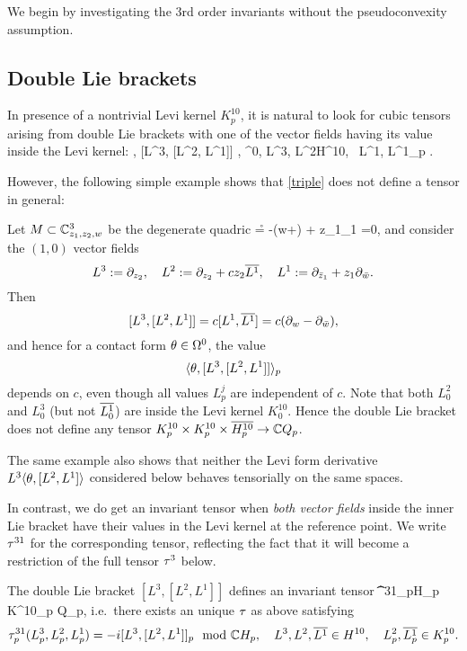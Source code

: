\documentclass[12pt]{amsart}
\begin{document}
We begin by investigating the $3$rd order invariants
without the pseudoconvexity assumption.

\subsection{Double Lie brackets}
In presence of a nontrivial Levi kernel $K^{10}_p$,
it is natural to look for cubic tensors
arising from double Lie brackets
with one of the vector fields 
having its value inside the Levi kernel: 
\beq{}
	\la \th, [L^3, [L^2, L^1]] \ra, 
	\quad
	\th \in \Om^0,
	\quad L^3, L^2\in H^{10}, 
	\, L^1\in {}, 
	\quad
	L^1_p \in {}.	
\eeq

However, the following simple example shows that 
\eqref{triple} does not define a tensor in general:

\be{}
Let $M\subset {\mathbb{C}}^3_{z_1, z_2, w}$ be
the degenerate quadric
\beq{}
	\r = -(w+\w) + z_1\z_1 =0,
\eeq
and consider the $(1,0)$ vector fields
$$
	L^3:= \partial_{z_2},
	\quad
	L^2:= \partial_{z_2} + cz_2 \overline{L^1},
	\quad
	L^1:= \partial_{{\bar z}_1} + z_1\partial_{{\bar w}}.
$$
Then 
$$
	[L^3, [L^2, L^1]] = c [L^1, \overline{L^1}] = c (\partial_{w} - \partial_{{\bar w}}),
$$
and hence for a contact form $\theta\in \Omega^0$,
the value $$\langle \theta, [L^3, [L^2, L^1]] \rangle_p$$
depends on $c$,
even though all values $L^j_p$ are independent of $c$.
Note that both $L^2_0$ and $L^3_0$ (but not $\overline{L^1_0}$)
are inside the Levi kernel $K^{10}_0$.
Hence the double Lie bracket does not define any tensor
$K^{10}_p\times K^{10}_p \times \overline{H^{10}_p}\to {\mathbb{C}} Q_p$.

The same example also shows that neither
the Levi form derivative $L^3 \langle \theta, [L^2, L^1]\rangle$
considered below
behaves tensorially on the same spaces.
\ee


In contrast, we do get an invariant tensor when {\em both vector fields}
inside the inner Lie bracket have their values in the Levi kernel
at the reference point.
We write $\tau^{31}$ for the corresponding tensor, 
reflecting the fact that it will become a restriction 
of the full tensor $\tau^3$ below.


\bl{}
	The double Lie bracket $[L^3, [L^2, L^1]]$ defines
	an invariant tensor
	\beq
		\t^{31}_p\colon \C H_p \times K^{10}_p \times {} \to \C Q_p,
	\eeq
	i.e.\ there exists an unique $\tau$ as above satisfying
	$$
		\tau^{31}_p(L^3_p, L^2_p, L^1_p) 
		= -i  [L^3, [L^2, L^1]]_p \mod {{\mathbb{C}}} H_p
		,
		\quad L^3, L^2, \overline{L^1} \in H^{10},
		\quad L^2_p, \overline{L^1_p}\in K^{10}_p.
	$$
	
\end{document}
